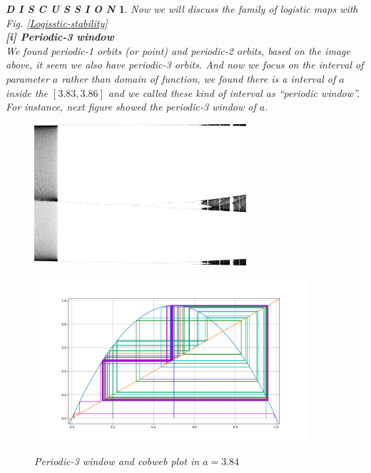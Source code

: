 \documentclass[12pt]{article}
\theoremstyle{plain}
\newtheorem{discussion}{\textit{D I S C U S S I O N}}[section]
\begin{document}
\newpage
\begin{discussion} Now we will discuss the family of logistic maps with Fig. \ref{Logisstic-stability}
\\\noindent \textbf{[i] Periodic-3 window}
\\\noindent We found periodic-1 orbits (or point) and periodic-2 orbits, based on the image above, it seem we also have periodic-3 orbits. And now we focus on the interval of parameter $a$ rather than domain of function, we found there is a interval of $a$ inside the $[3.83, 3.86]$ and we called these kind of interval as ``periodic window''. For instance, next figure showed the periodic-3 window of $a$.

\begin{figure}[H]
\begin{minipage}[c][0.5\width]{
   0.5\textwidth}
   \centering
   \includegraphics[width=0.70\textwidth]{figure/section1/periodic-3-window.png}
\end{minipage}
\begin{minipage}[c][0.5\width]{
   0.5\textwidth}
   \centering
   \includegraphics[width=0.9\textwidth]{figure/section1/logistic384.png} \\
\end{minipage}
\caption{Periodic-3 window and cobweb plot in $a = 3.84$}\label{logistic-cobweb-plot1}
\end{figure}


\end{discussion}
\end{document}
